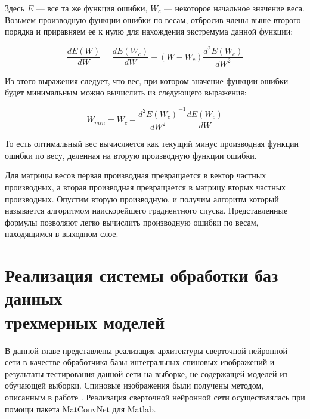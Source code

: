 \documentclass[14pt]{article}
\numberwithin{figure}{section}
\numberwithin{equation}{section}
\begin{document}
Здесь $E$ — все та же функция ошибки, $W_c$ — некоторое начальное значение веса. Возьмем производную функции ошибки по весам, отбросив члены выше второго порядка и приравняем ее к нулю для нахождения экстремума данной функции:

\begin{equation}
	\frac{dE(W)}{dW} = \frac{dE(W_c)}{dW} + (W - W_c)\frac{d^2E(W_c)}{dW^2}
\end{equation}

Из этого выражения следует, что вес, при котором значение функции ошибки будет минимальным можно вычислить из следующего выражения:

\begin{equation}
	W_{min} = W_c - \frac{d^2E(W_c)}{dW^2}^{-1} \frac{dE(W_c)}{dW}
\end{equation}

То есть оптимальный вес вычисляется как текущий минус производная функции ошибки по весу, деленная на вторую производную функции ошибки.

Для матрицы весов первая производная превращается в вектор частных производных, а вторая производная превращается в матрицу вторых частных производных. Опустим вторую производную, и получим алгоритм который называется алгоритмом наискорейшего градиентного спуска. Представленные формулы позволяют легко вычислить производную ошибки по весам, находящимся в выходном слое.

\newpage

\section{Реализация системы обработки баз данных \\ трехмерных моделей}

В данной главе представлены реализация архитектуры сверточной нейронной сети в качестве обработчика базы интегральных спиновых изображений и результаты тестирования данной сети на выборке, не содержащей моделей из обучающей выборки. Спиновые изображения были получены методом, описанным в работе \cite{Chernikoff}. Реализация сверточной нейронной сети осуществлялась при помощи пакета MatConvNet для Matlab.

\end{document}
